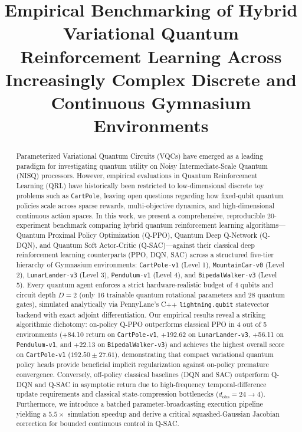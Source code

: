 \documentclass[conference]{IEEEtran}
\begin{document}
\title{Empirical Benchmarking of Hybrid Variational Quantum Reinforcement Learning Across Increasingly Complex Discrete and Continuous Gymnasium Environments}

\author{
}

\maketitle

\begin{abstract}
Parameterized Variational Quantum Circuits (VQCs) have emerged as a leading paradigm for investigating quantum utility on Noisy Intermediate-Scale Quantum (NISQ) processors. However, empirical evaluations in Quantum Reinforcement Learning (QRL) have historically been restricted to low-dimensional discrete toy problems such as \texttt{CartPole}, leaving open questions regarding how fixed-qubit quantum policies scale across sparse rewards, multi-objective dynamics, and high-dimensional continuous action spaces. In this work, we present a comprehensive, reproducible 20-experiment benchmark comparing hybrid quantum reinforcement learning algorithms---Quantum Proximal Policy Optimization (Q-PPO), Quantum Deep Q-Network (Q-DQN), and Quantum Soft Actor-Critic (Q-SAC)---against their classical deep reinforcement learning counterparts (PPO, DQN, SAC) across a structured five-tier hierarchy of Gymnasium environments: \texttt{CartPole-v1} (Level 1), \texttt{MountainCar-v0} (Level 2), \texttt{LunarLander-v3} (Level 3), \texttt{Pendulum-v1} (Level 4), and \texttt{BipedalWalker-v3} (Level 5). Every quantum agent enforces a strict hardware-realistic budget of 4 qubits and circuit depth $D=2$ (only 16 trainable quantum rotational parameters and 28 quantum gates), simulated analytically via PennyLane's C++ \texttt{lightning.qubit} statevector backend with exact adjoint differentiation. Our empirical results reveal a striking algorithmic dichotomy: on-policy Q-PPO outperforms classical PPO in 4 out of 5 environments (+84.10 return on \texttt{CartPole-v1}, +192.62 on \texttt{LunarLander-v3}, +56.11 on \texttt{Pendulum-v1}, and +22.13 on \texttt{BipedalWalker-v3}) and achieves the highest overall score on \texttt{CartPole-v1} ($192.50 \pm 27.61$), demonstrating that compact variational quantum policy heads provide beneficial implicit regularization against on-policy premature convergence. Conversely, off-policy classical baselines (DQN and SAC) outperform Q-DQN and Q-SAC in asymptotic return due to high-frequency temporal-difference update requirements and classical state-compression bottlenecks ($d_{\text{obs}}=24 \to 4$). Furthermore, we introduce a batched parameter-broadcasting execution pipeline yielding a $5.5\times$ simulation speedup and derive a critical squashed-Gaussian Jacobian correction for bounded continuous control in Q-SAC.
\end{abstract}
\end{document}
